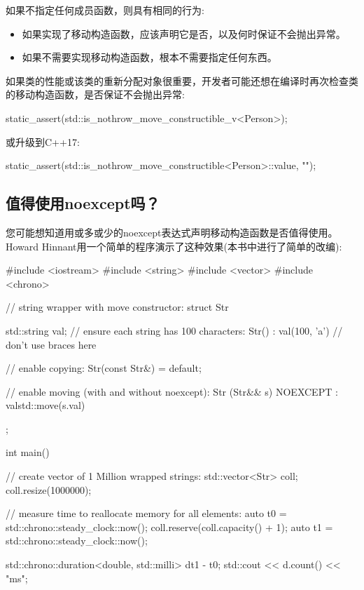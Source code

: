 如果不指定任何成员函数，则具有相同的行为:

\begin{itemize}
	\item 如果实现了移动构造函数，应该声明它是否，以及何时保证不会抛出异常。
	\item 如果不需要实现移动构造函数，根本不需要指定任何东西。
\end{itemize}

如果类的性能或该类的重新分配对象很重要，开发者可能还想在编译时再次检查类的移动构造函数，是否保证不会抛出异常:

\begin{cppcode}
static_assert(std::is_nothrow_move_constructible_v<Person>);
\end{cppcode}

或升级到C++17:

\begin{cppcode}
static_assert(std::is_nothrow_move_constructible<Person>::value, "");
\end{cppcode}

\subsection{值得使用noexcept吗？}

您可能想知道用或多或少的noexcept表达式声明移动构造函数是否值得使用。Howard Hinnant用一个简单的程序演示了这种效果(本书中进行了简单的改编):

\begin{cppcode}
#include <iostream>
#include <string>
#include <vector>
#include <chrono>

// string wrapper with move constructor:
struct Str
{
	std::string val;
	// ensure each string has 100 characters:
	Str()
	: val(100, 'a') { // don’t use braces here
	}

	// enable copying:
	Str(const Str&) = default;
	
	// enable moving (with and without noexcept):
	Str (Str&& s) NOEXCEPT
	: val{std::move(s.val)} {
	}
};

int main()
{
	// create vector of 1 Million wrapped strings:
	std::vector<Str> coll;
	coll.resize(1000000);
	
	// measure time to reallocate memory for all elements:
	auto t0 = std::chrono::steady_clock::now();
	coll.reserve(coll.capacity() + 1);
	auto t1 = std::chrono::steady_clock::now();
	
	std::chrono::duration<double, std::milli> d{t1 - t0};
	std::cout << d.count() << "ms\n";
}
\end{cppcode}

